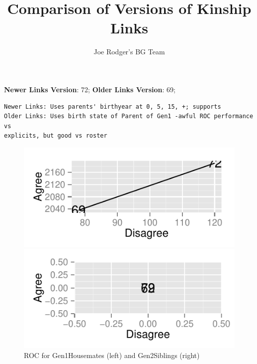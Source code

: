 \documentclass[a4paper]{article}\usepackage{graphicx, color}
\title{Comparison of Versions of Kinship Links}
\author{Joe Rodger's BG Team}
\makeatletter
\def\maxwidth{ %
  \ifdim\Gin@nat@width>\linewidth
    \linewidth
  \else
    \Gin@nat@width
  \fi
}
\newenvironment{kframe}{%
 \def\at@end@of@kframe{}%
 \ifinner\ifhmode%
  \def\at@end@of@kframe{\end{minipage}}%
  \begin{minipage}{\columnwidth}%
 \fi\fi%
 \def\FrameCommand##1{\hskip\@totalleftmargin \hskip-\fboxsep
 \colorbox{shadecolor}{##1}\hskip-\fboxsep
     \hskip-\linewidth \hskip-\@totalleftmargin \hskip\columnwidth}%
 \MakeFramed {\advance\hsize-\width
   \@totalleftmargin\z@ \linewidth\hsize
   \@setminipage}}%
 {\par\unskip\endMakeFramed%
 \at@end@of@kframe}
\newenvironment{knitrout}{}{} %
\makeatother
\begin{document}
\maketitle

\setlength{\parindent}{0pt}%







\textbf{Newer Links Version}: 72;
\textbf{Older Links Version}: 69;

\begin{knitrout}
\color{fgcolor}\begin{kframe}
\begin{verbatim}
Newer Links: Uses parents' birthyear at 0, 5, 15, +; supports
Older Links: Uses birth state of Parent of Gen1 -awful ROC performance vs
explicits, but good vs roster
\end{verbatim}
\end{kframe}
\end{knitrout}


\begin{figure}[htbp]
\begin{knitrout}
\color{fgcolor}
\includegraphics[width=\maxwidth]{figure/unnamed-chunk-31} 

\includegraphics[width=\maxwidth]{figure/unnamed-chunk-32} 

\end{knitrout}

\caption{ROC for Gen1Housemates (left) and Gen2Siblings (right)}
\end{figure}
\end{document}
